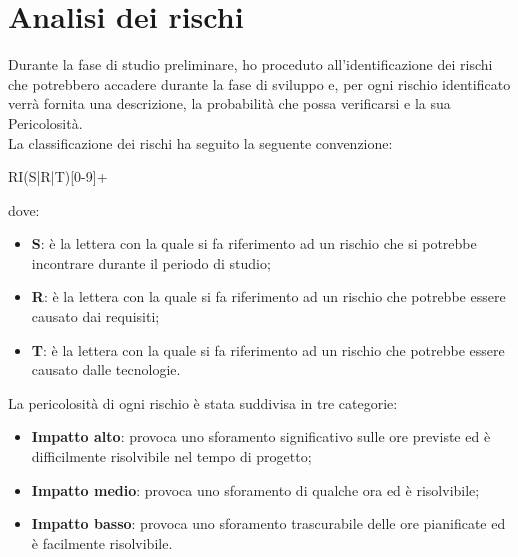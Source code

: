 
\section{Analisi dei rischi}
Durante la fase di studio preliminare, ho proceduto all'identificazione dei rischi che potrebbero accadere durante la fase di sviluppo e, per ogni rischio identificato verrà fornita una descrizione, la probabilità che possa verificarsi e la sua Pericolosità. \\

La classificazione dei rischi ha seguito la seguente convenzione:
\begin{center}
  RI(S|R|T)[0-9]+
\end{center}
dove:
\begin{itemize}
  \item \textbf{S}: è la lettera con la quale si fa riferimento ad un rischio che si potrebbe incontrare durante il periodo di studio;
  \item \textbf{R}: è la lettera con la quale si fa riferimento ad un rischio che potrebbe essere causato dai requisiti;
  \item \textbf{T}: è la lettera con la quale si fa riferimento ad un rischio che potrebbe essere causato dalle tecnologie.
\end{itemize}

La pericolosità di ogni rischio è stata suddivisa in tre categorie:
\begin{itemize}
  \item \textbf{Impatto alto}: provoca uno sforamento significativo sulle ore previste ed è difficilmente risolvibile nel tempo di progetto;
  \item \textbf{Impatto medio}: provoca uno sforamento di qualche ora ed è risolvibile;
  \item \textbf{Impatto basso}: provoca uno sforamento trascurabile delle ore pianificate ed è facilmente risolvibile.
\end{itemize}

